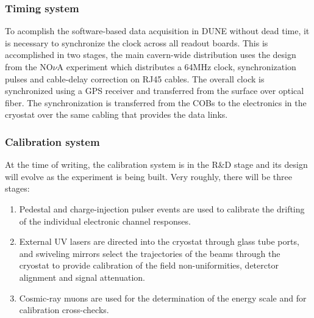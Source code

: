 \subsubsection{Timing system}
To acomplish the software-based data acquisition in DUNE without dead time, it is
necessary to synchronize the clock across all readout boards.  This is accomplished
in two stages, the main cavern-wide distribution uses the design from the NO$\nu$A
experiment which distributes a 64MHz clock, synchronization pulses and
cable-delay correction on RJ45 cables.  The overall clock is
synchronized using a GPS receiver and transferred from the surface
over optical fiber.  The synchronization is transferred from the COBs
to the electronics in the cryostat over the same cabling that provides
the data links.

\subsubsection{Calibration system}
\label{sec:daq-calibrations}

At the time of writing, the calibration system is in the R\&D stage and its design will
evolve as the experiment is being built. Very roughly, there will be three stages:
\begin{enumerate}

\item Pedestal and charge-injection pulser events are used to calibrate 
the drifting of the individual electronic channel responses.

\item External UV lasers are directed into the cryostat through glass tube
ports, and swiveling mirrors select the trajectories of the beams
through the cryostat to provide calibration of the field
non-uniformities, deterctor alignment and signal attenuation.

\item Cosmic-ray muons are used for the determination of the energy scale and for calibration
cross-checks.

\end{enumerate}



